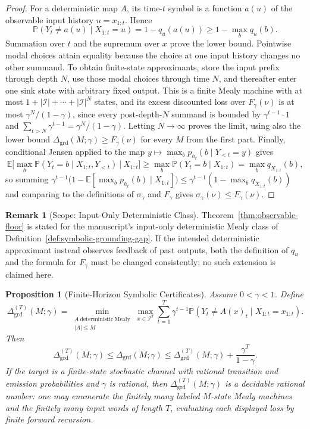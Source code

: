 \documentclass[12pt]{article}
\newtheorem{proposition}[theorem]{Proposition}
\theoremstyle{definition}
\newtheorem{remark}[theorem]{Remark}
\begin{document}
\begin{proof}
For a deterministic map $A$, its time-$t$ symbol is a function $a(u)$ of the
observable input history $u=x_{1:t}$.  Hence
\[
\mathbb P(Y_t\ne a(u)\mid X_{1:t}=u)=1-q_u(a(u))
\ge1-\max_bq_u(b).
\]
Summation over $t$ and the supremum over $x$ prove the lower bound.
Pointwise modal choices attain equality because the choice at one input
history changes no other summand.  To obtain finite-state approximants,
store the input prefix through depth $N$, use those modal choices through
time $N$, and thereafter enter one sink state with arbitrary fixed output.
This is a finite Mealy machine with at most
$1+|\mathcal I|+\cdots+|\mathcal I|^{N}$ states, and its excess discounted
loss over $F_\gamma(\nu)$ is at most $\gamma^N/(1-\gamma)$, since every
post-depth-$N$ summand is bounded by $\gamma^{t-1}\cdot1$ and
$\sum_{t>N}\gamma^{t-1}=\gamma^N/(1-\gamma)$.  Letting $N\to\infty$ proves
the limit, using also the lower bound
$\Delta_{\mathrm{grd}}(M;\gamma)\ge F_\gamma(\nu)$ for every $M$ from the
first part.  Finally, conditional Jensen applied to the map
$y\mapsto\max_bp_{h_t}(b\mid Y_{<t}=y)$ gives
\[
\mathbb E\bigl[\max_b\mathbb P(Y_t=b\mid X_{1:t},Y_{<t})\ \big|\ X_{1:t}\bigr]
\ge
\max_b\mathbb P(Y_t=b\mid X_{1:t})=\max_bq_{X_{1:t}}(b),
\]
so summing $\gamma^{t-1}\bigl(1-\mathbb E[\max_bp_{h_t}(b)\mid X_{1:t}]\bigr)
\le\gamma^{t-1}(1-\max_bq_{X_{1:t}}(b))$ and comparing to the definitions of
$\sigma_\gamma$ and $F_\gamma$ gives $\sigma_\gamma(\nu)\le F_\gamma(\nu)$.
\end{proof}

\begin{remark}[Scope: Input-Only Deterministic Class]
\label{rem:observable-floor-scope}
Theorem~\ref{thm:observable-floor} is stated for the manuscript's
input-only deterministic Mealy class of
Definition~\ref{def:symbolic-grounding-gap}.  If the intended deterministic
approximant instead observes feedback of past outputs, both the definition
of $q_u$ and the formula for $F_\gamma$ must be changed consistently; no such
extension is claimed here.
\end{remark}

\begin{proposition}[Finite-Horizon Symbolic Certificates]
\label{prop:symbolic-finite-horizon}
Assume $0<\gamma<1$.  Define
\[
\Delta^{(T)}_{\mathrm{grd}}(M;\gamma)
=
\min_{\substack{A\ \mathrm{deterministic\ Mealy}\\|A|\le M}}
\max_{x\in\mathcal I^T}
\sum_{t=1}^T\gamma^{t-1}
\mathbb P(Y_t\ne A(x)_t\mid X_{1:t}=x_{1:t}).
\]
Then
\[
\Delta^{(T)}_{\mathrm{grd}}(M;\gamma)
\le
\Delta_{\mathrm{grd}}(M;\gamma)
\le
\Delta^{(T)}_{\mathrm{grd}}(M;\gamma)+\frac{\gamma^T}{1-\gamma}.
\]
If the target is a finite-state stochastic channel with rational transition
and emission probabilities and $\gamma$ is rational, then
$\Delta^{(T)}_{\mathrm{grd}}(M;\gamma)$ is a decidable rational number: one
may enumerate the finitely many labeled $M$-state Mealy machines and the
finitely many input words of length $T$, evaluating each displayed loss by
finite forward recursion.
\end{proposition}
\end{document}
